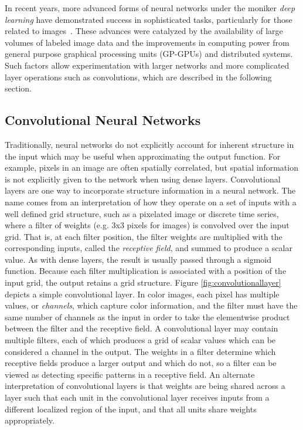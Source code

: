 In recent years, more advanced forms of neural networks under the moniker \textit{deep learning} have demonstrated success in sophisticated tasks, particularly for those related to images~\cite{lecun2015}. 
These advances were catalyzed by the availability of large volumes of labeled image data and the improvements in computing power from general purpose graphical processing units (GP-GPUs) and distributed systems.
Such factors allow experimentation with larger networks and more complicated layer operations such as convolutions, which are described in the following section.

\subsection{Convolutional Neural Networks}

Traditionally, neural networks do not explicitly account for inherent structure in the input which may be useful when approximating the output function.
For example, pixels in an image are often spatially correlated, but spatial information is not explicitly given to the network when using dense layers.
Convolutional layers are one way to incorporate structure information in a neural network. 
The name comes from an interpretation of how they operate on a set of inputs with a well defined grid structure, such as a pixelated image or discrete time series, where a filter of weights (e.g. 3x3 pixels for images) is convolved over the input grid.
That is, at each filter position, the filter weights are multiplied with the corresponding inputs, called the \textit{receptive field}, and summed to produce a scalar value.
As with dense layers, the result is usually passed through a sigmoid function.
Because each filter multiplication is associated with a position of the input grid, the output retains a grid structure.
Figure \ref{fig:convolutionallayer} depicts a simple convolutional layer.
In color images, each pixel has multiple values, or \textit{channels}, which capture color information, and the filter must have the same number of channels as the input in order to take the elementwise product between the filter and the receptive field.
A convolutional layer may contain multiple filters, each of which produces a grid of scalar values which can be considered a channel in the output.
The weights in a filter determine which receptive fields produce a larger output and which do not, so a filter can be viewed as detecting specific patterns in a receptive field.
An alternate interpretation of convolutional layers is that weights are being shared across a layer such that each unit in the convolutional layer receives inputs from a different localized region of the input, and that all units share weights appropriately.

